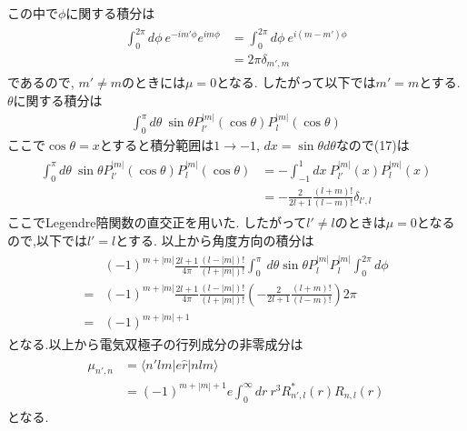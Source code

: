 \documentclass[uplatex,a4j,11pt,dvipdfmx]{jsarticle}
\begin{document}
この中で$\phi$に関する積分は
\begin{align}
  \begin{split}
    \int_0^{2\pi}d\phi\ e^{-im'\phi}e^{im\phi}&=\int_0^{2\pi}d\phi\ e^{i(m-m')\phi}\\
    &=2\pi\delta_{m',m}
  \end{split}
\end{align}
であるので, $m'\neq m$のときには$\mu=0$となる.
したがって以下では$m'=m$とする.
$\theta$に関する積分は
\begin{align}
  \int_0^\pi d\theta\ \sin\theta P_{l'}^{|m|}(\cos\theta)P_{l}^{|m|}(\cos\theta)
\end{align}
ここで$\cos\theta=x$とすると積分範囲は$1\rightarrow -1$, $dx=\sin\theta d\theta$なので(17)は
\begin{align}
  \begin{split}
    \int_0^\pi d\theta\ \sin\theta P_{l'}^{|m|}(\cos\theta)P_{l}^{|m|}(\cos\theta)
    &=-\int_{-1}^1dx\ P_{l'}^{|m|}(x)P_{l}^{|m|}(x)\\
    &=-\frac{2}{2l+1}\frac{(l+m)!}{(l-m)!}\delta_{l',l}
  \end{split}
\end{align}
ここでLegendre陪関数の直交正を用いた.
したがって$l'\neq l$のときは$\mu=0$となるので,以下では$l'=l$とする.
以上から角度方向の積分は
\begin{align}
  \begin{split}
    &(-1)^{m+|m|}\frac{2l+1}{4\pi}\frac{(l-|m|)!}{(l+|m|)!}\int_0^\pi\ d\theta\sin\theta P_l^{|m|}P_l^{|m|}\int_0^{2\pi}d\phi\\
    =&(-1)^{m+|m|}\frac{2l+1}{4\pi}\frac{(l-|m|)!}{(l+|m|)!}\left(-\frac{2}{2l+1}\frac{(l+m)!}{(l-m)!}\right)2\pi\\
    =&(-1)^{m+|m|+1}
  \end{split}
\end{align}
となる.以上から電気双極子の行列成分の非零成分は
\begin{align}
  \begin{split}
    \mu_{n',n}&=\langle n'lm|e\hat{r}|nlm\rangle\\
    &=(-1)^{m+|m|+1}e\int_0^\infty dr\ r^3R_{n',l}^*(r)R_{n,l}(r)
  \end{split}
\end{align}
となる.
\end{document}
